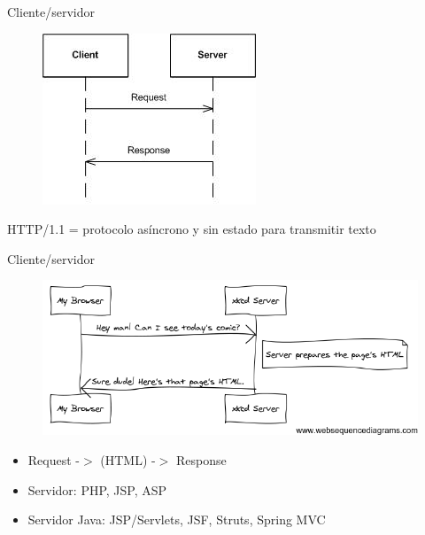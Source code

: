 \documentclass{beamer}
\begin{document}
\begin{frame}{Cliente/servidor}
\begin{figure}
\centering
\includegraphics[width=0.5\linewidth]{Images/requestresponse}
\label{fig:requestresponse}
\end{figure}
\pause HTTP/1.1 = protocolo asíncrono y sin estado para transmitir texto
\end{frame}

\begin{frame}{Cliente/servidor}
	\begin{figure}
	\centering
	\includegraphics[width=0.8\linewidth]{Images/http-xkcd}
	\label{fig:http-xkcd}
	\end{figure}
	\pause
	\begin{itemize}
	\item Request -$>$ (HTML) -$>$ Response
	\item Servidor: PHP, JSP, ASP
	\item Servidor Java: JSP/Servlets, JSF, Struts, Spring MVC
	\end{itemize}
\end{frame}
\end{document}
